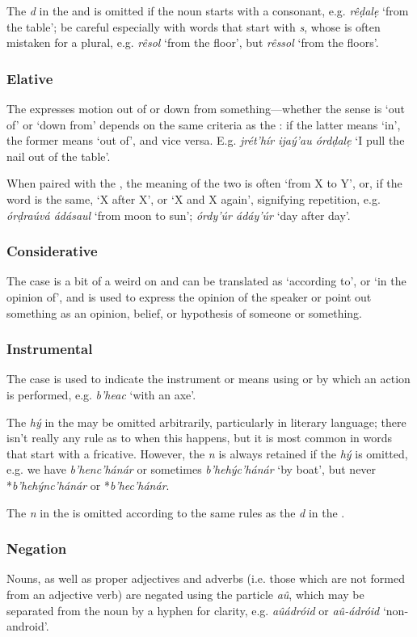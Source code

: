 \documentclass[a4paper, 12pt, twoside, final]{article}
\let \w \textit
\begin{document}
The \w{d} in the  and is omitted if the noun starts with a consonant, e.g. \w{rêḍalẹ} ‘from the table’; be
careful especially with words that start with \w{s}, whose  is often mistaken for a plural, e.g. \w{rêsol}
‘from the floor’, but \w{rêssol} ‘from the floors’.

\subsubsection{Elative}
The  expresses motion out of or down from something—whether the sense is ‘out of’ or ‘down from’ depends on the
same criteria as the : if the latter means ‘in’, the former means ‘out of’, and vice versa. E.g.
\w{jrét’hír ijaý’au órdḍalẹ} ‘I pull the nail out of the table’.

When paired with the , the meaning of the two is often ‘from X to Y’, or, if the word is the same, ‘X after X’,
or ‘X and X again’, signifying repetition, e.g. \w{órḍraúvá ádásaul} ‘from moon to sun’; \w{órdy’úr ádáy’úr} ‘day after
day’.

\subsubsection{Considerative}
The  case is a bit of a weird on and can be translated as ‘according to’, or ‘in the opinion of’, and is used to
express the opinion of the speaker or point out something as an opinion, belief, or hypothesis of someone or something.

\subsubsection{Instrumental}
The  case is used to indicate the instrument or means using or by which an action is performed, e.g. \w{b’heac}
‘with an axe’.

The \w{hý} in the  may be omitted arbitrarily, particularly in literary language; there
isn’t really any rule as to when this happens, but it is most common in words that start with a fricative. However, the \w{n}
is always retained if the \w{hý} is omitted, e.g. we have \w{b’henc’hánár} or sometimes \w{b’hehýc’hánár} ‘by boat’, but never
*\w{b’hehýnc’hánár} or *\w{b’hec’hánár}.

The \w{n} in the  is omitted according to the same rules as the \w{d} in the .

\subsubsection{Negation}\label{subsubsec:noun-negation}
Nouns, as well as proper adjectives and adverbs (i.e. those which are not formed from an adjective verb) are negated
using the particle \w{aû}, which may be separated from the noun by a hyphen for clarity, e.g. \w{aûádróid} or \w{aû-ádróid}
‘non-android’.
\end{document}
